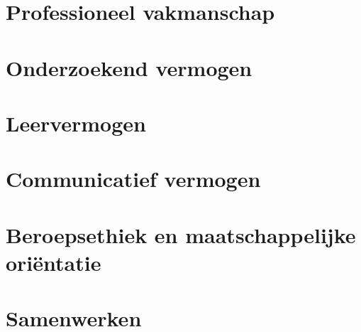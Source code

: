 \documentclass[11pt]{report}
\begin{document}
	\maketitle
	\tableofcontents
	
	\chapter{Professioneel vakmanschap}
	\newpage
	
	\newpage
	
	\chapter{Onderzoekend vermogen}
	\newpage
	
	\newpage
	
	\chapter{Leervermogen}
	\newpage
	
	\newpage
	
	\chapter{Communicatief vermogen}
	\newpage
	
	\newpage
	
	\chapter{Beroepsethiek en maatschappelijke oriëntatie}
	\newpage
	
	\newpage
		
	\chapter{Samenwerken}
	\newpage
	
	\newpage
	
	
	\renewcommand\appendixname{Appendix}
	
	\appendix
	
\end{document}
